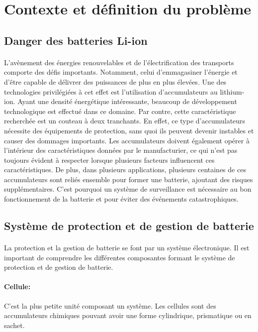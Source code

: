 \section{Contexte et définition du problème}

	\subsection{Danger des batteries Li-ion}
	
		\paragraph{}
		L'avènement des énergies renouvelables et de l'électrification des transports comporte des défis importants. Notamment, celui d'emmagasiner l'énergie et d'être capable de délivrer des puissances de plus en plus élevées. Une des technologies privilégiées à cet effet est l'utilisation d'accumulateurs au lithium-ion. Ayant une densité énergétique intéressante, beaucoup de développement technologique est effectué dans ce domaine. Par contre, cette caractéristique recherchée est un couteau à deux tranchants. En effet, ce type d'accumulateurs nécessite des équipements de protection, sans quoi ils peuvent devenir instables et causer des dommages importants. Les accumulateurs doivent également opérer à l'intérieur des caractéristiques données par le manufacturier, ce qui n'est pas toujours évident à respecter lorsque plusieurs facteurs influencent ces caractéristiques. De plus, dans plusieurs applications, plusieurs centaines de ces accumulateurs sont reliés ensemble pour former une batterie, ajoutant des risques supplémentaires. C'est pourquoi un système de surveillance est nécessaire au bon fonctionnement de la batterie et pour éviter des événements catastrophiques.
	
	\subsection{Système de protection et de gestion de batterie}
	
		\paragraph{}
		La protection et la gestion de batterie se font par un système électronique. Il est important de comprendre les différentes composantes formant le système de protection et de gestion de batterie.
		
		\paragraph{Cellule:}
		 C'est la plus petite unité composant un système. Les cellules sont des accumulateurs chimiques pouvant avoir une forme cylindrique, prismatique ou en sachet.  
		
